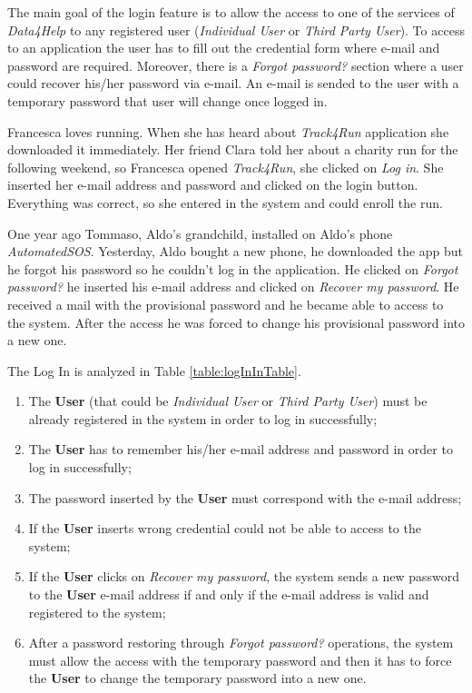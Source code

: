The main goal of the login feature is to allow the access to one of the services of \textit{Data4Help} to any registered user (\textit{Individual User} or \textit{Third Party User}). To access to an application the user has to fill out the credential form where e-mail and password are required. Moreover, there is a \textit{Forgot password?} section where a user could recover his/her password via e-mail. An e-mail is sended to the user with a temporary password that user will change once logged in.

Francesca loves running. When she has heard about \textit{Track4Run} application she downloaded it immediately. Her friend Clara told her about a charity run for the following weekend, so Francesca opened \textit{Track4Run}, she clicked on \textit{Log in}. She inserted her e-mail address and password and clicked on the login button. Everything was correct, so she entered in the system and could enroll the run.

One year ago Tommaso, Aldo's grandchild, installed on Aldo’s phone \textit{AutomatedSOS}. Yesterday, Aldo bought a new phone, he downloaded the app but he forgot his password so he couldn’t log in the application. He clicked on \textit{Forgot password?} he inserted his e-mail address and clicked on \textit{Recover my password}. He received a mail with the provisional password and he became able to access to the system. After the access he was forced to change his provisional password into a new one.

The Log In is analyzed in Table \ref{table:logInInTable}.

\begin{enumerate}
  \item The \textbf{User} (that could be \textit{Individual User} or \textit{Third Party User}) must be already registered in the system in order to log in successfully;
  \item The \textbf{User} has to remember his/her e-mail address and password in order to log in successfully;
  \item The password inserted by the \textbf{User} must correspond with the e-mail address;
  \item If the \textbf{User} inserts wrong credential could not be able to access to the system;
  \item If the \textbf{User} clicks on \textit{Recover my password}, the system sends a new password to the \textbf{User} e-mail address if and only if the e-mail address is valid and registered to the system;
  \item After a password restoring through \textit{Forgot password?} operations, the system must allow the access with the temporary password and then it has to force the \textbf{User} to change the temporary password into a new one.
\end{enumerate}

